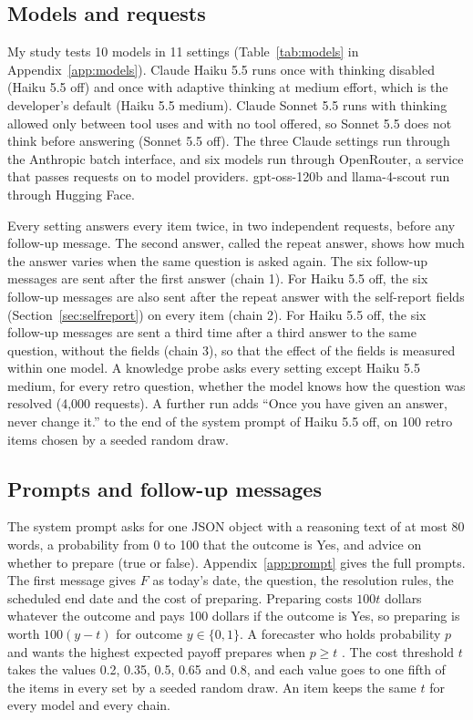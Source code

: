 \documentclass[11pt]{article}
\begin{document}
\subsection{Models and requests}

My study tests 10 models in 11 settings (Table~\ref{tab:models} in Appendix~\ref{app:models}). Claude Haiku 5.5 runs once with thinking disabled (Haiku 5.5 off) and once with adaptive thinking at medium effort, which is the developer's default (Haiku 5.5 medium). Claude Sonnet 5.5 runs with thinking allowed only between tool uses and with no tool offered, so Sonnet 5.5 does not think before answering (Sonnet 5.5 off). The three Claude settings run through the Anthropic batch interface, and six models run through OpenRouter, a service that passes requests on to model providers. gpt-oss-120b and llama-4-scout run through Hugging Face.

Every setting answers every item twice, in two independent requests, before any follow-up message. The second answer, called the repeat answer, shows how much the answer varies when the same question is asked again. The six follow-up messages are sent after the first answer (chain 1). For Haiku 5.5 off, the six follow-up messages are also sent after the repeat answer with the self-report fields (Section~\ref{sec:selfreport}) on every item (chain 2). For Haiku 5.5 off, the six follow-up messages are sent a third time after a third answer to the same question, without the fields (chain 3), so that the effect of the fields is measured within one model. A knowledge probe asks every setting except Haiku 5.5 medium, for every retro question, whether the model knows how the question was resolved (4,000 requests). A further run adds ``Once you have given an answer, never change it.'' to the end of the system prompt of Haiku 5.5 off, on 100 retro items chosen by a seeded random draw.

\subsection{Prompts and follow-up messages}

The system prompt asks for one JSON object with a reasoning text of at most 80 words, a probability from 0 to 100 that the outcome is Yes, and advice on whether to prepare (true or false). Appendix~\ref{app:prompt} gives the full prompts. The first message gives $F$ as today's date, the question, the resolution rules, the scheduled end date and the cost of preparing. Preparing costs $100t$ dollars whatever the outcome and pays 100 dollars if the outcome is Yes, so preparing is worth $100(y-t)$ for outcome $y\in\{0,1\}$. A forecaster who holds probability $p$ and wants the highest expected payoff prepares when $p\geq t$ \citep{murphy1977}. The cost threshold $t$ takes the values 0.2, 0.35, 0.5, 0.65 and 0.8, and each value goes to one fifth of the items in every set by a seeded random draw. An item keeps the same $t$ for every model and every chain.
\end{document}

